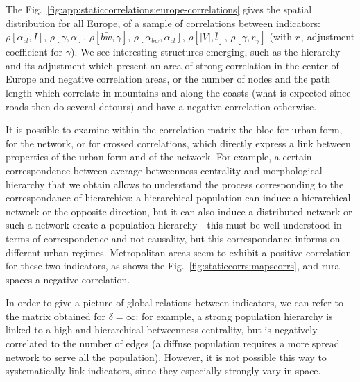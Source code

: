 \documentclass[11pt]{article}
\newcommand{\rhob}[2]{\ensuremath{\rho\!\left[#1,#2\right]}}
\begin{document}
The Fig.~\ref{fig:app:staticcorrelations:europe-correlations} gives the spatial distribution for all Europe, of a sample of correlations between indicators: $\rhob{\alpha_{cl}}{I}$, $\rhob{\gamma}{\alpha}$, $\rhob{\bar{bw}}{\gamma}$, $\rhob{\alpha_{bw}}{\alpha_{cl}}$, $\rhob{\left|V\right|}{\bar{l}}$, $\rhob{\gamma}{r_{\gamma}}$ (with $r_{\gamma}$ adjustment coefficient for $\gamma$). We see interesting structures emerging, such as the hierarchy and its adjustment which present an area of strong correlation in the center of Europe and negative correlation areas, or the number of nodes and the path length which correlate in mountains and along the coasts (what is expected since roads then do several detours) and have a negative correlation otherwise.




It is possible to examine within the correlation matrix the bloc for urban form, for the network, or for crossed correlations, which directly express a link between properties of the urban form and of the network. For example, a certain correspondence between average betweenness centrality and morphological hierarchy that we obtain allows to understand the process corresponding to the correspondance of hierarchies: a hierarchical population can induce a hierarchical network or the opposite direction, but it can also induce a distributed network or such a network create a population hierarchy - this must be well understood in terms of correspondence and not causality, but this correspondance informs on different urban regimes. Metropolitan areas seem to exhibit a positive correlation for these two indicators, as shows the Fig.~\ref{fig:staticcorrs:mapscorrs}, and rural spaces a negative correlation.


In order to give a picture of global relations between indicators, we can refer to the matrix obtained for $\delta = \infty$: for example, a strong population hierarchy is linked to a high and hierarchical betweenness centrality, but is negatively correlated to the number of edges (a diffuse population requires a more spread network to serve all the population). However, it is not possible this way to systematically link indicators, since they especially strongly vary in space. 
\end{document}
